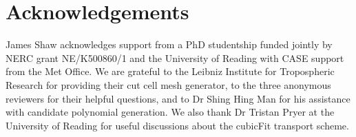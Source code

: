 \documentclass[times]{elsarticle}
\newcommand{\revother}[1]{#1}
\begin{document}






\section{Acknowledgements}
James Shaw acknowledges support from a PhD studentship funded jointly by NERC grant NE/K500860/1 and the University of Reading with CASE support from the Met Office.
We are grateful to the Leibniz Institute for Tropospheric Research for providing their cut cell mesh generator, \revother{to the three anonymous reviewers for their helpful questions,} and to Dr Shing Hing Man for his assistance with candidate polynomial generation.  We also thank Dr Tristan Pryer at the University of Reading for useful discussions about the cubicFit transport scheme.






\end{document}
